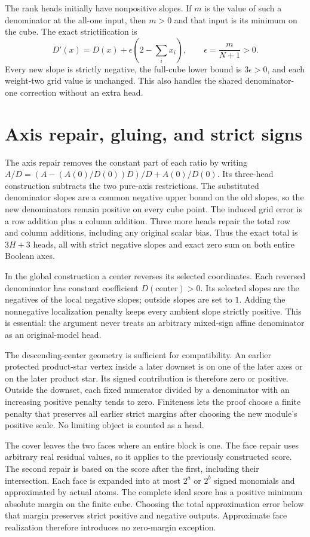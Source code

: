 \documentclass[11pt]{article}
\begin{document}
The rank heads initially have nonpositive slopes. If $m$ is the value
of such a denominator at the all-one input, then $m>0$ and that input
is its minimum on the cube. The exact strictification is
\[
 D'(x)=D(x)+\epsilon\left(2-\sum_i x_i\right),
 \qquad \epsilon=\frac{m}{N+1}>0.
\]
Every new slope is strictly negative, the full-cube lower bound is
$3\epsilon>0$, and each weight-two grid value is unchanged. This also
handles the shared denominator-one correction without an extra head.

\section{Axis repair, gluing, and strict signs}
The axis repair removes the constant part of each ratio by writing
$A/D=(A-(A(0)/D(0))D)/D+A(0)/D(0)$. Its three-head construction
subtracts the two pure-axis restrictions. The substituted denominator
slopes are a common negative upper bound on the old slopes, so the new
denominators remain positive on every cube point. The induced grid
error is a row addition plus a column addition. Three more heads
repair the total row and column additions, including any original
scalar bias. Thus the exact total is $3H+3$ heads, all with strict
negative slopes and exact zero sum on both entire Boolean axes.

In the global construction a center reverses its selected coordinates.
Each reversed denominator has constant coefficient $D(\mathrm{center})>0$.
Its selected slopes are the negatives of the local negative slopes;
outside slopes are set to $1$. Adding the nonnegative localization
penalty keeps every ambient slope strictly positive. This is essential:
the argument never treats an arbitrary mixed-sign affine denominator
as an original-model head.

The descending-center geometry is sufficient for compatibility. An
earlier protected product-star vertex inside a later downset is on
one of the later axes or on the later product star. Its signed
contribution is therefore zero or positive. Outside the downset, each
fixed numerator divided by a denominator with an increasing positive
penalty tends to zero. Finiteness lets the proof choose a finite
penalty that preserves all earlier strict margins after choosing the
new module's positive scale. No limiting object is counted as a head.

The cover leaves the two faces where an entire block is one. The face
repair uses arbitrary real residual values, so it applies to the
previously constructed score. The second repair is based on the score
after the first, including their intersection. Each face is expanded
into at most $2^a$ or $2^b$ signed monomials and approximated by actual
atoms. The complete ideal score has a positive minimum absolute margin
on the finite cube. Choosing the total approximation error below that
margin preserves strict positive and negative outputs. Approximate
face realization therefore introduces no zero-margin exception.
\end{document}
